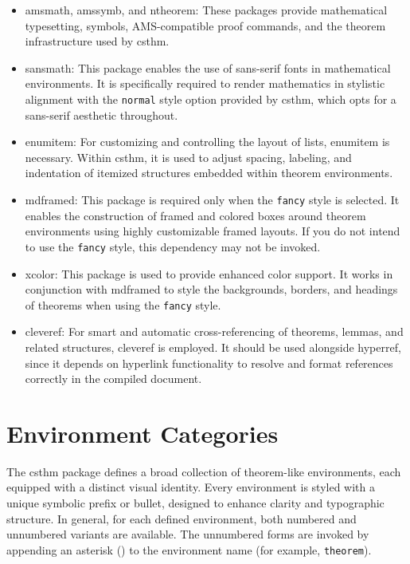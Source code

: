 \documentclass[10pt,letterpaper]{amsart}
\begin{document}
\begin{itemize}[label={--}]
	\item \textsf{amsmath}, \textsf{amssymb}, and \textsf{ntheorem}: These packages provide mathematical typesetting, symbols, AMS-compatible proof commands, and the theorem infrastructure used by \textsf{csthm}.

	\item \textsf{sansmath}: This package enables the use of sans-serif fonts in mathematical environments. It is specifically required to render mathematics in stylistic alignment with the \texttt{normal} style option provided by \textsf{csthm}, which opts for a sans-serif aesthetic throughout.

	\item \textsf{enumitem}: For customizing and controlling the layout of lists, \textsf{enumitem} is necessary. Within \textsf{csthm}, it is used to adjust spacing, labeling, and indentation of itemized structures embedded within theorem environments.

	\item \textsf{mdframed}: This package is required only when the \texttt{fancy} style is selected. It enables the construction of framed and colored boxes around theorem environments using highly customizable framed layouts. If you do not intend to use the \texttt{fancy} style, this dependency may not be invoked.

	\item \textsf{xcolor}: This package is used to provide enhanced color support. It works in conjunction with \textsf{mdframed} to style the backgrounds, borders, and headings of theorems when using the \texttt{fancy} style.

	\item \textsf{cleveref}: For smart and automatic cross-referencing of theorems, lemmas, and related structures, \textsf{cleveref} is employed. It should be used alongside \textsf{hyperref}, since it depends on hyperlink functionality to resolve and format references correctly in the compiled document.

\end{itemize}

\section{Environment Categories}

The \textsf{csthm} package defines a broad collection of theorem-like
environments, each equipped with a distinct visual identity. Every environment
is styled with a unique symbolic prefix or bullet, designed to enhance clarity
and typographic structure. In general, for each defined environment, both
numbered and unnumbered variants are available. The unnumbered forms are
invoked by appending an asterisk (\texttt{\ast}) to the environment name (for
example, \texttt{theorem}).
\end{document}
